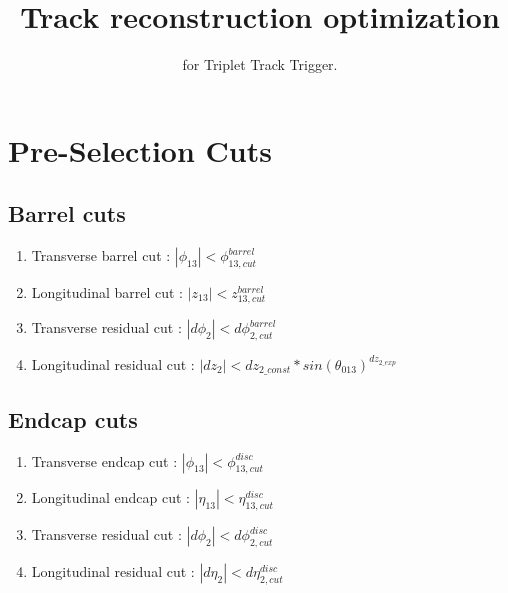 \documentclass[11pt,a4paper]{article}
\title{Track reconstruction optimization}
\author{for Triplet Track Trigger.}
\date{}
\begin{document}
\maketitle

\section*{Pre-Selection Cuts}
\subsection*{Barrel cuts}
\begin{enumerate}
\item Transverse barrel cut : $|\phi_{13}| < \phi_{13, cut}^{barrel}$ 
\item Longitudinal barrel cut  : $|z_{13}| < z_{13, cut}^{barrel}$ 
\item Transverse residual cut : $|d\phi_{2}| < d\phi_{2, cut}^{barrel}$
\item Longitudinal residual cut : $|dz_{2}| <  dz_{2 \_const}* sin(\theta_{013})^{dz_{2 \_exp}}$
\end{enumerate}
\subsection*{Endcap cuts}
\begin{enumerate}
\item Transverse endcap cut : $|\phi_{13}| < \phi_{13, cut}^{disc}$ 
\item Longitudinal endcap cut  : $|\eta_{13}| < \eta_{13, cut}^{disc}$ 
\item Transverse residual cut : $|d\phi_{2}| < d\phi_{2, cut}^{disc}$
\item Longitudinal residual cut : $|d\eta_{2}| <  d\eta_{2, cut}^{disc}$
\end{enumerate}
\end{document}
